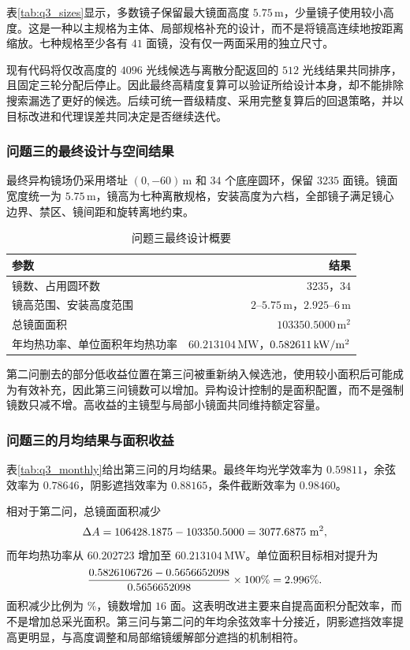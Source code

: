 
表\ref{tab:q3_sizes}显示，多数镜子保留最大镜面高度 $5.75\,\mathrm m$，少量镜子使用较小高度。这是一种以主规格为主体、局部规格补充的设计，而不是将镜高连续地按距离缩放。七种规格至少各有 $41$ 面镜，没有仅一两面采用的独立尺寸。

现有代码将仅改高度的 $4096$ 光线候选与离散分配返回的 $512$ 光线结果共同排序，且固定三轮分配后停止。因此最终高精度复算可以验证所给设计本身，却不能排除搜索漏选了更好的候选。后续可统一晋级精度、采用完整复算后的回退策略，并以目标改进和代理误差共同决定是否继续迭代。

\pagepart
\subsubsection{问题三的最终设计与空间结果}
最终异构镜场仍采用塔址 $(0,-60)\,\mathrm m$ 和 $34$ 个底座圆环，保留 $3235$ 面镜。镜面宽度统一为 $5.75\,\mathrm m$，镜高为七种离散规格，安装高度为六档，全部镜子满足镜心边界、禁区、镜间距和旋转离地约束。
\begin{table}[H]\centering\small
\caption{问题三最终设计概要}
\begin{tabular}{lr}\toprule
参数 & 结果\\\midrule
镜数、占用圆环数 & $3235$，$34$\\
镜高范围、安装高度范围 & $2$--$5.75\,\mathrm m$，$2.925$--$6\,\mathrm m$\\
总镜面面积 & $103350.5000\,\mathrm m^2$\\
年均热功率、单位面积年均热功率 & $60.213104\,\mathrm{MW}$，$0.582611\,\mathrm{kW}/\mathrm{m}^2$\\
\bottomrule\end{tabular}\end{table}
第二问删去的部分低收益位置在第三问被重新纳入候选池，使用较小面积后可能成为有效补充，因此第三问镜数可以增加。异构设计控制的是面积配置，而不是强制镜数只减不增。高收益的主镜型与局部小镜面共同维持额定容量。

\pagepart
\subsubsection{问题三的月均结果与面积收益}
表\ref{tab:q3_monthly}给出第三问的月均结果。最终年均光学效率为 $0.59811$，余弦效率为 $0.78646$，阴影遮挡效率为 $0.88165$，条件截断效率为 $0.98460$。

相对于第二问，总镜面面积减少
\begin{equation}
\Delta A=106428.1875-103350.5000=3077.6875\ \mathrm m^2,
\end{equation}
而年均热功率从 $60.202723$ 增加至 $60.213104\,\mathrm{MW}$。单位面积目标相对提升为
\begin{equation}
\frac{0.5826106726-0.5656652098}{0.5656652098}\times100\%
=2.996\%.
\end{equation}
面积减少比例为 \Saving\%，镜数增加 $16$ 面。这表明改进主要来自提高面积分配效率，而不是增加总采光面积。第三问与第二问的年均余弦效率十分接近，阴影遮挡效率提高更明显，与高度调整和局部缩镜缓解部分遮挡的机制相符。

